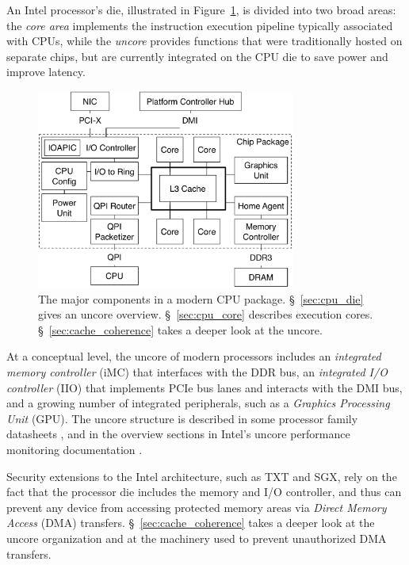 An Intel processor's die, illustrated in Figure~\ref{fig:cpu_die}, is divided
into two broad areas: the \textit{core area} implements the instruction
execution pipeline typically associated with CPUs, while the \textit{uncore}
provides functions that were traditionally hosted on separate chips, but are
currently integrated on the CPU die to save power and improve latency.

\begin{figure}[hbt]
  \centering
  \includegraphics[width=85mm]{figures/cpu_die.pdf}
  \caption{
    The major components in a modern CPU package. \S~\ref{sec:cpu_die} gives
    an uncore overview. \S~\ref{sec:cpu_core} describes execution cores.
    \S~\ref{sec:cache_coherence} takes a deeper look at the uncore.
  }
  \label{fig:cpu_die}
\end{figure}


At a conceptual level, the uncore of modern processors includes an
\textit{integrated memory controller} (iMC) that interfaces with the DDR bus,
an \textit{integrated I/O controller} (IIO) that implements PCIe bus lanes and
interacts with the DMI bus, and a growing number of integrated peripherals,
such as a \textit{Graphics Processing Unit} (GPU). The uncore structure is
described in some processor family datasheets \cite{intel2014datasheet,
intel2010datasheet}, and in the overview sections in Intel's uncore performance
monitoring documentation \cite{intel2014uncore, intel2012uncore,
intel2010uncore}.

Security extensions to the Intel architecture, such as TXT and SGX, rely on the
fact that the processor die includes the memory and I/O controller, and thus
can prevent any device from accessing protected memory areas via
\textit{Direct Memory Access} (DMA) transfers. \S~\ref{sec:cache_coherence}
takes a deeper look at the uncore organization and at the machinery used to
prevent unauthorized DMA transfers.


